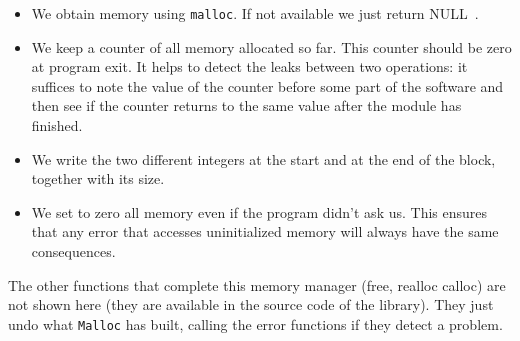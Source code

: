 \documentclass[12pt,a4paper,openany]{memoir} %
\newif\iftth
\newcommand{\Null}{{\iftth \ NULL \else \footnotesize NULL\  \fi}}
\begin{document}
{{\begin{itemize}
\begin{enumerate}
\end{enumerate}
\item We obtain memory using \texttt{malloc}. If not available we just return \Null.
\item We keep a counter of all memory allocated so far. This counter should be zero at program exit. It helps to detect the leaks between two 
operations: it suffices to note the value of the counter before some part of the software and then see if the counter returns to the
same value after the module has finished.
\item We write the two different integers at the start and at the end of the block, together with its size.
\item We set to zero all memory even if the program didn't ask us. This ensures that any error that accesses uninitialized memory will 
always have the same consequences.
\end{itemize}
The other functions that complete this memory manager (free, realloc calloc) are not shown here (they are available in the source code 
of the library). They just undo what \texttt{Malloc} has built, calling the error functions if they detect a problem.

}}
\end{document}
